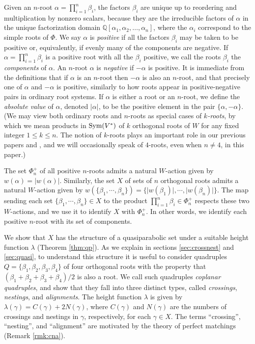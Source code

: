 \documentclass[11pt]{amsart}
\theoremstyle{plain}
\theoremstyle{definition}
\theoremstyle{remark}
\numberwithin{equation}{subsection}
\newcommand{\al}{\alpha}
\newcommand{\be}{\beta}
\newcommand{\Q}{{\mathbb Q}}
\newcommand{\fh}{V}
\newcommand{\allroots}{\Phi}
\newcommand{\Sym}{\text{\rm Sym}}
\newcommand{\abs}[1]{\lvert #1 \rvert}
\begin{document}
Given an $n$-root $\al=\prod_{i=1}^n\be_i$, the factors $\be_i$ are unique up to
reordering and multiplication by nonzero scalars, because they are the
irreducible factors of $\al$ in the unique factorization domain $\Q[\al_1,
\al_2, \ldots, \al_n]$, where the $\al_i$ correspond to the simple roots of
$\allroots$.  We say $\al$ is {\it positive} if all the factors $\be_i$ may be
taken to be positive or, equivalently, if evenly many of the components are
negative. If $\al=\prod_{i=1}^n \be_i$ is a positive root with all the $\be_i$
positive, we call the roots $\be_i$ the \emph{components} of $\al$. An $n$-root
$\al$ is {\it negative} if $-\al$ is positive. It is immediate from the
definitions that if $\al$ is an $n$-root then $-\al$ is also an $n$-root, and
that precisely one of $\al$ and $-\al$ is positive, similarly to how roots
appear in positive-negative pairs in ordinary root systems. If $\al$ is either a
root or an $n$-root, we define the \emph{absolute value} of $\al$, denoted
$\abs{\al}$, to be the positive element in the pair $\{\al,-\al\}$.  (We may
    view both ordinary roots and $n$-roots as special cases of \emph{$k$-roots},
    by which we mean products in $\Sym(\fh^*)$ of $k$ orthogonal roots of $W$
    for any fixed integer $1\le k\le n$.  The notion of $k$-roots plays an
    important role in our previous papers \cite{gx3} and \cite{green23}, and we
    will occasionally speak of $4$-roots, even when $n\neq 4$, in this paper.)

The set $\Phi^+_n$ of all positive $n$-roots admits a natural $W$-action given
by $w(\al)=\abs{w(\al)}$. Similarly, the set $X$ of sets of $n$ orthogonal roots
admits a natural $W$-action given by
$w(\{\be_1,\cdots,\be_n\})=\{\abs{w(\be_1)}, \cdots, \abs{w(\be_n)}\}$.  The map
sending each set $\{\be_1,\cdots,\be_n\}\in X$ to the product $\prod_{i=1}^n
\be_i\in \Phi^+_n$ respects these two $W$-actions, and we use it to identify $X$
with $\Phi^+_n$. In other words, we identify each positive $n$-root with its set of components.

We show that $X$ has the structure of a quasiparabolic set under a suitable
height function $\lambda$ (Theorem \ref{thm:qp}).  As we explain in sections
\ref{sec:crossnest} and \ref{sec:quasi}, to understand this structure it is
useful to consider quadruples $Q = \{\be_1, \be_2, \be_3, \be_4\}$ of four
orthogonal roots with the property that $(\be_1 + \be_2 + \be_3 + \be_4)/2$ is
also a root. We call such quadruples \emph{coplanar quadruples}, and show that
they fall into three distinct types, called {\it crossings}, {\it nestings}, and
{\it alignments}.  The height function $\lambda$ is given by
$\lambda(\gamma)=C(\gamma)+2N(\gamma)$, where $C(\gamma)$ and $N(\gamma)$ are
the numbers of crossings and nestings in $\gamma$, respectively, for each
$\gamma\in X$. The terms ``crossing'', ``nesting'', and ``alignment'' are
motivated by the theory of perfect matchings (Remark \ref{rmk:cna}).
\end{document}
